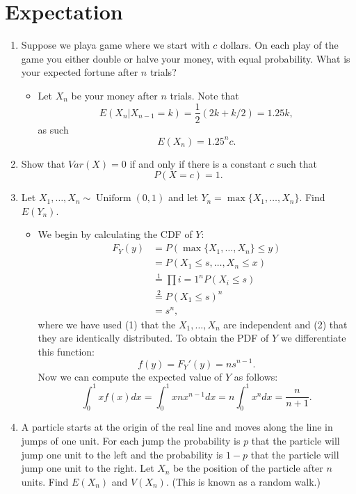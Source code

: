 \documentclass{article}
\begin{document}
\section{Expectation}
\begin{enumerate}
	\item Suppose we playa game where we start with $c$ dollars. On each play of the game you either double or halve your money, with equal probability. What is your expected fortune after $n$ trials?
		\begin{itemize}
			\item Let $X_n$ be your money after $n$ trials. Note that
			$$
			E(X_n|X_{n - 1} = k) = \frac{1}{2}(2k + k / 2) = 1.25k,
			$$
			as such
			$$
			E(X_n) = 1.25^n c.
			$$
		\end{itemize}
	\item Show that $Var(X) = 0$ if and only if there is a constant $c$ such that
	$$
	P(X = c) = 1.
	$$
	\item Let $X_1, \dots, X_n \sim \operatorname{Uniform}(0, 1)$ and let $Y_n = \max \{X_1, \dots, X_n\}$. Find $E(Y_n)$.
		\begin{itemize}
			\item We begin by calculating the CDF of $Y$:
			$$
			\begin{aligned}
				F_Y(y) &= P(\max\{X_1, \dots, X_n\} \leq y) \\
				&= P(X_1 \leq s, \dots, X_n \leq x) \\
				&\overset{1}{=} \prod{i = 1}^n P(X_i \leq s) \\
				&\overset{2}{=} P(X_1 \leq s)^n \\
				&= s^n,
			\end{aligned}
			$$
			where we have used (1) that the $X_1, \dots, X_n$ are independent and (2) that they are identically distributed. To obtain the PDF of $Y$ we differentiate this function:
			$$
			f(y) = F_Y'(y) = n s^{n - 1}.
			$$
			Now we can compute the expected value of $Y$ as follows:
			$$
			\int_0^1 x f(x) dx = \int_0^1 x n x^{n - 1} dx = n \int_0^1 x^n dx = \frac{n}{n + 1}. 
			$$
		\end{itemize}
	\item A particle starts at the origin of the real line and moves along the line in jumps of one unit. For each jump the probability is $p$ that the particle will jump one unit to the left and the probability is $1-p$ that the particle
	will jump one unit to the right. Let $X_n$ be the position of the particle after $n$ units. Find $E(X_n)$ and $V(X_n)$. (This is known as a random walk.)

\end{enumerate}
\end{document}
